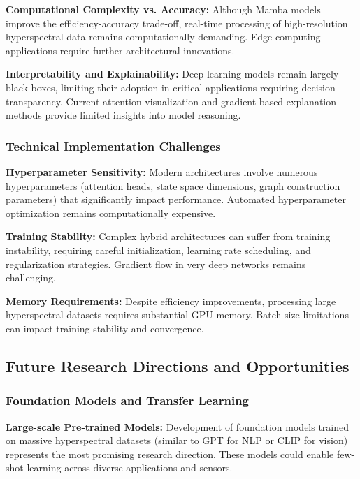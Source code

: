 \documentclass[journal]{IEEEtran}
\begin{document}
\textbf{Computational Complexity vs. Accuracy:} Although Mamba models improve the efficiency-accuracy trade-off, real-time processing of high-resolution hyperspectral data remains computationally demanding. Edge computing applications require further architectural innovations.

\textbf{Interpretability and Explainability:} Deep learning models remain largely black boxes, limiting their adoption in critical applications requiring decision transparency. Current attention visualization and gradient-based explanation methods provide limited insights into model reasoning.

\subsubsection{Technical Implementation Challenges}

\textbf{Hyperparameter Sensitivity:} Modern architectures involve numerous hyperparameters (attention heads, state space dimensions, graph construction parameters) that significantly impact performance. Automated hyperparameter optimization remains computationally expensive.

\textbf{Training Stability:} Complex hybrid architectures can suffer from training instability, requiring careful initialization, learning rate scheduling, and regularization strategies. Gradient flow in very deep networks remains challenging.

\textbf{Memory Requirements:} Despite efficiency improvements, processing large hyperspectral datasets requires substantial GPU memory. Batch size limitations can impact training stability and convergence.

\subsection{Future Research Directions and Opportunities}

\subsubsection{Foundation Models and Transfer Learning}

\textbf{Large-scale Pre-trained Models:} Development of foundation models trained on massive hyperspectral datasets (similar to GPT for NLP or CLIP for vision) represents the most promising research direction. These models could enable few-shot learning across diverse applications and sensors.
\end{document}
